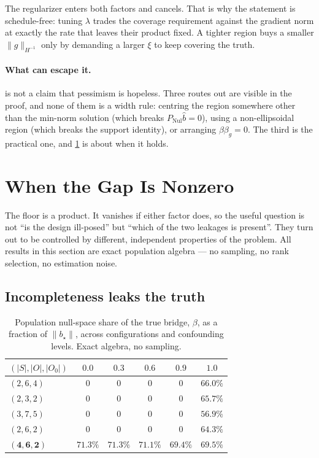 \documentclass{article}
\theoremstyle{plain}
\theoremstyle{definition}
\DeclareMathOperator{\Nul}{Nul}
\newcommand{\Pnul}{P_{\Nul}}
\newcommand{\btrue}{b_{\star}}
\newcommand{\bhat}{\hat{b}}
\begin{document}
The regularizer enters both factors and cancels. That is why the statement is
schedule-free: tuning $\lambda$ trades the coverage requirement against the
gradient norm at exactly the rate that leaves their product fixed. A tighter
region buys a smaller $\lVert g\rVert_{H^{-1}}$ only by demanding a larger $\xi$
to keep covering the truth.

\paragraph{What can escape it.}  is not a claim that pessimism
is hopeless. Three routes out are visible in the proof, and none of them is a
width rule: centring the region somewhere other than the min-norm solution (which
breaks $\Pnul\bhat=0$), using a non-ellipsoidal region (which breaks the support
identity), or arranging $\beta\beta_g = 0$. The third is the practical one, and
\cref{sec:switches} is about when it holds.

\section{When the Gap Is Nonzero}
\label{sec:switches}

The floor is a product. It vanishes if either factor does, so the useful question
is not ``is the design ill-posed'' but ``which of the two leakages is present''.
They turn out to be controlled by different, independent properties of the
problem. All results in this section are exact population algebra --- no
sampling, no rank selection, no estimation noise.

\subsection{Incompleteness leaks the truth}
\label{sec:switch-beta}

\begin{table}[t]
\caption{Population null-space share of the true bridge, $\beta$, as a fraction
of $\lVert\btrue\rVert$, across configurations and confounding levels. Exact
algebra, no sampling.}
\label{tab:beta}
\begin{center}\small\setlength{\tabcolsep}{3.5pt}
\begin{tabular}{@{}lccccc@{}}
\toprule
$(|S|,|O|,|O_0|)$ & $0.0$ & $0.3$ & $0.6$ & $0.9$ & $1.0$ \\
\midrule
$(2,6,4)$ & $0$ & $0$ & $0$ & $0$ & $66.0\%$ \\
$(2,3,2)$ & $0$ & $0$ & $0$ & $0$ & $65.7\%$ \\
$(3,7,5)$ & $0$ & $0$ & $0$ & $0$ & $56.9\%$ \\
$(2,6,2)$ & $0$ & $0$ & $0$ & $0$ & $64.3\%$ \\
$\mathbf{(4,6,2)}$ & $\mathbf{71.3\%}$ & $\mathbf{71.3\%}$ & $\mathbf{71.1\%}$
                   & $\mathbf{69.4\%}$ & $\mathbf{69.5\%}$ \\
\bottomrule
\end{tabular}
\end{center}
\end{table}
\end{document}
